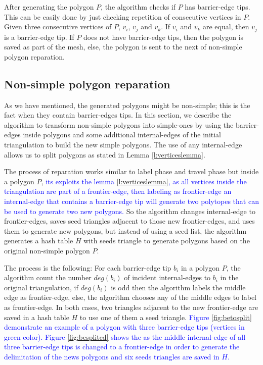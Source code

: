 \documentclass[pdflatex,sn-mathphys]{sn-jnl}%
\theoremstyle{thmstyleone}%
\theoremstyle{thmstyletwo}%
\theoremstyle{thmstylethree}%
\begin{document}
After generating the polygon $P$, the algorithm checks if $P$ has barrier-edge tips. This can be easily done by just checking repetition of consecutive vertices in $P$. Given three consecutive vertices of $P$, $v_i$, $v_j$ and $v_k$. If $v_i$ and $v_k$ are equal, then $v_j$ is a barrier-edge tip. If $P$ does not have barrier-edge tips, then the polygon is saved as part of the mesh, else, the polygon is sent to the next of non-simple polygon reparation.




\subsection{Non-simple polygon reparation}
\label{subsec:nonsimplereparation}

As we have mentioned, the generated polygons might be non-simple; this is the fact when they contain barrier-edges tips. In this section, we describe the algorithm to transform non-simple polygons into simple-ones by using the barrier-edges inside polygons and some additional internal-edges of the initial triangulation to build the new simple polygons. The use of any internal-edge allows us to split polygons as stated in Lemma \ref{l:verticeslemma}.

The process of reparation works similar to label phase and travel phase but inside a polygon $P$, \textcolor{blue}{ its exploits the lemma \ref{l:verticeslemma}, as all vertices inside the triangulation are part of a frontier-edge, then labeling as frontier-edge an internal-edge that contains a barrier-edge tip will generate two polytopes that can be used to generate two new polygons.} So the algorithm changes internal-edge to frontier-edges, saves seed triangles adjacent to those new frontier-edges, and uses them to generate new polygons, but instead of using a seed list, the algorithm generates a hash table $H$ with seeds triangle to generate polygons based on the original non-simple polygon $P$. 

The process is the following: For each barrier-edge tip $b_i$ in a polygon $P$, the algorithm count the number $deg(b_i)$ of incident internal-edges to $b_i$ in the original triangulation, if $deg(b_i)$ is odd then the algorithm labels the middle edge as frontier-edge, else, the algorithm chooses any of the middle edges to label as frontier-edge. In both cases, two triangles adjacent to the new frontier-edge are saved in a hash table $H$ to use one of them a seed triangle. \textcolor{blue}{Figure \ref{fig:betosplit} demonstrate an example of a polygon with three barrier-edge tips (vertices in green color). Figure \ref{fig:besplited} shows the as the middle internal-edge of all three barrier-edge tips is changed to a frontier-edge in order to generate the delimitation of the news polygons and six seeds triangles are saved in $H$.}
\end{document}

